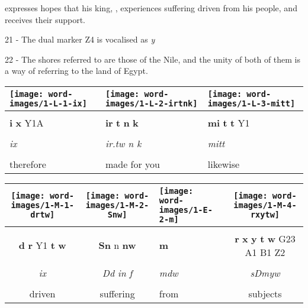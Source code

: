 \vspace*{\fill}

\pagebreak

\vspace*{\fill}

 expresses hopes that his king, , experiences suffering driven from his people, and receives their support.

\vspace*{\fill}

21 - The dual marker Z4 is vocalised as \textit{y}

22 - The shores referred to are those of the Nile, and the unity of both of them is a way of referring to the land of Egypt.

\pagebreak


\vspace*{\fill}

\begin{tabularx}{\linewidth}{YYY}
	\texttt{[image: word-images/1-L-1-ix]} &
	\texttt{[image: word-images/1-L-2-irtnk]} &
	\texttt{[image: word-images/1-L-3-mitt]} \\
	\hline \\ 
	\textbf{i} \textbf{x} Y1A &
	\textbf{ir} \textbf{t} \textbf{n} \textbf{k} &
	\textbf{mi} \textbf{t} \textbf{t} Y1 \\
	\hline \\ 
	\textit{ix} & \textit{ir.tw n k} & \textit{mitt} \\
	\hline \\ 
	therefore & made for you & likewise
\end{tabularx}

\vspace{7.5mm}

\begin{tabularx}{\linewidth}{ccYc}
	\texttt{[image: word-images/1-M-1-drtw]} &
	\texttt{[image: word-images/1-M-2-Snw]} &
	\texttt{[image: word-images/1-E-2-m]} &
	\texttt{[image: word-images/1-M-4-rxytw]} \\
	\hline \\ 
	\textbf{d} \textbf{r} Y1 \textbf{t} \textbf{w} &
	\textbf{Sn} n \textbf{nw} &
	\textbf{m} &
	\textbf{r} \textbf{x} \textbf{y} \textbf{t} \textbf{w} G23 A1 B1 Z2 \\
	\hline \\ 
	\textit{ix} & \hspace*{-4mm} \textit{Dd in f} & \textit{mdw} & \textit{sDmyw} \\
	\hline \\ 
	driven & suffering & from & subjects
\end{tabularx}

